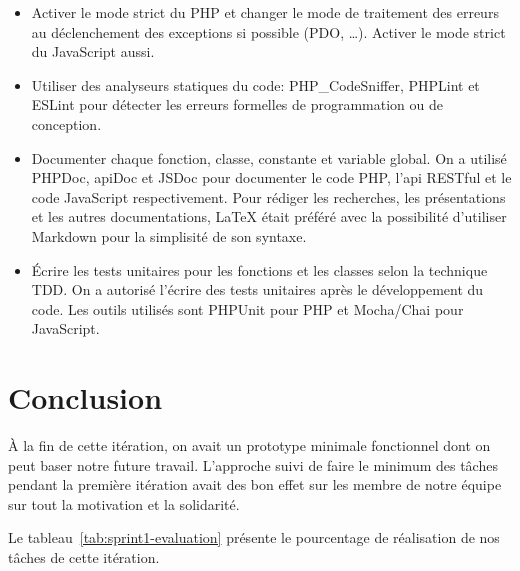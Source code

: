 \begin{itemize}
    \item Activer le mode strict du PHP et changer le mode de traitement des
        erreurs au déclenchement des exceptions si possible (PDO, \ldots).
        Activer le mode strict du JavaScript aussi.
    \item Utiliser des analyseurs statiques du code: PHP\_CodeSniffer, PHPLint
        et ESLint pour détecter les erreurs formelles de programmation ou de
        conception.
    \item Documenter chaque fonction, classe, constante et variable global. On
        a utilisé PHPDoc, apiDoc et JSDoc pour documenter le code PHP, l'api
        RESTful et le code JavaScript respectivement. Pour rédiger les
        recherches, les présentations et les autres documentations, \LaTeX{}
        était préféré avec la possibilité d'utiliser Markdown pour la
        simplisité de son syntaxe.
    \item Écrire les tests unitaires pour les fonctions et les classes selon la
        technique \acrshort{TDD}. On a autorisé l'écrire des tests unitaires
        après le développement du code. Les outils utilisés sont PHPUnit pour
        PHP et Mocha/Chai pour JavaScript.
\end{itemize}

\section*{Conclusion}

À la fin de cette itération, on avait un prototype minimale fonctionnel
dont on peut baser notre future travail.
L'approche suivi de faire le minimum des tâches pendant la première itération
avait des bon effet sur les membre de notre équipe sur tout la motivation et
la solidarité.

Le tableau~\ref{tab:sprint1-evaluation} présente le pourcentage de
réalisation de nos tâches de cette itération.

